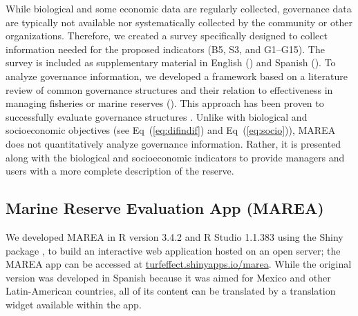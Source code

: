 \documentclass[10pt,letterpaper]{article}
\begin{document}
While biological and some economic data are regularly collected, governance data are typically not available nor systematically collected by the community or other organizations. Therefore, we created a survey specifically designed to collect information needed for the proposed indicators (B5, S3, and G1--G15). The survey is included as supplementary material in English () and Spanish (). To analyze governance information, we developed a framework based on a literature review of common governance structures and their relation to effectiveness in managing fisheries or marine reserves (). This approach has been proven to successfully evaluate governance structures \cite{espinosaromero_2014-PY}. Unlike with biological and socioeconomic objectives (see Eq~(\ref{eq:difindif}) and Eq~(\ref{eq:socio})), MAREA does not quantitatively analyze governance information. Rather, it is presented along with the biological and socioeconomic indicators to provide managers and users with a more complete description of the reserve.

\subsection*{Marine Reserve Evaluation App (MAREA)}\label{marine-reserve-evaluation-app-marea}

We developed MAREA in R version 3.4.2 and R Studio 1.1.383 \cite{rcore_2017} using the Shiny package \cite{shiny_2017}, to build an interactive web application hosted on an open server; the MAREA app can be accessed at \href{turfeffect.shinyapps.io/marea/}{turfeffect.shinyapps.io/marea}. While the original version was developed in Spanish because it was aimed for Mexico and other Latin-American countries, all of its content can be translated by a translation widget available within the app.
\end{document}
